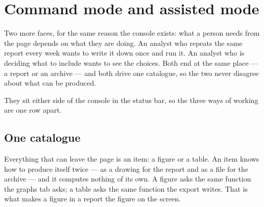 \chapter{Command mode and assisted mode}\label{ch:modes}

Two more faces, for the same reason the console exists: what a person needs from
the page depends on what they are doing. An analyst who repeats the same report
every week wants to write it down once and run it. An analyst who is deciding what
to include wants to see the choices. Both end at the same place --- a report or an
archive --- and both drive one catalogue, so the two never disagree about what can
be produced.

They sit either side of the console in the status bar, so the three ways of
working are one row apart.

{\small\noindent{}}


\section{One catalogue}
Everything that can leave the page is an item: a figure or a table. An item knows
how to produce itself twice --- as a drawing for the report and as a file for the
archive --- and it computes nothing of its own. A figure asks the same function the
graphs tab asks; a table asks the same function the export writes. That is what
makes a figure in a report the figure on the screen.

